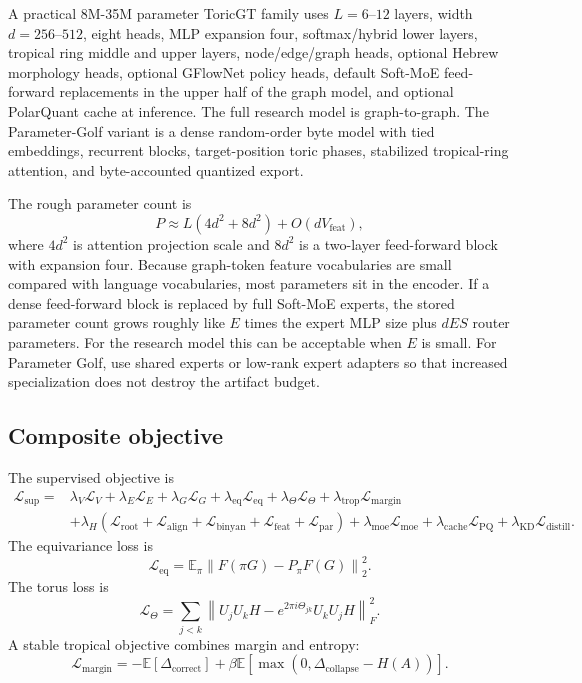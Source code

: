 \documentclass[11pt]{article}
\theoremstyle{definition}
\theoremstyle{plain}
\theoremstyle{remark}
\numberwithin{equation}{section}
\newcommand{\Eop}{\mathbb{E}}
\newcommand{\norm}[1]{\left\lVert #1\right\rVert}
\begin{document}
A practical 8M-35M parameter ToricGT family uses $L=6$--$12$ layers, width $d=256$--$512$, eight heads, MLP expansion four, softmax/hybrid lower layers, tropical ring middle and upper layers, node/edge/graph heads, optional Hebrew morphology heads, optional GFlowNet policy heads, default Soft-MoE feed-forward replacements in the upper half of the graph model, and optional PolarQuant cache at inference.  The full research model is graph-to-graph.  The Parameter-Golf variant is a dense random-order byte model with tied embeddings, recurrent blocks, target-position toric phases, stabilized tropical-ring attention, and byte-accounted quantized export.

The rough parameter count is
\begin{equation}
  P\approx L\left(4d^2+8d^2\right)+O(dV_{\mathrm{feat}}),
\end{equation}
where $4d^2$ is attention projection scale and $8d^2$ is a two-layer feed-forward block with expansion four.  Because graph-token feature vocabularies are small compared with language vocabularies, most parameters sit in the encoder.  If a dense feed-forward block is replaced by full Soft-MoE experts, the stored parameter count grows roughly like $E$ times the expert MLP size plus $dES$ router parameters.  For the research model this can be acceptable when $E$ is small.  For Parameter Golf, use shared experts or low-rank expert adapters so that increased specialization does not destroy the artifact budget.

\subsection{Composite objective}

The supervised objective is
\begin{equation}
\begin{split}
  \mathcal L_{\mathrm{sup}}={}&\lambda_V\mathcal L_V+\lambda_E\mathcal L_E+\lambda_G\mathcal L_G+
  \lambda_{\mathrm{eq}}\mathcal L_{\mathrm{eq}}+
  \lambda_\Theta\mathcal L_\Theta+\lambda_{\mathrm{trop}}\mathcal L_{\mathrm{margin}}\\
  &+\lambda_H(\mathcal L_{\mathrm{root}}+\mathcal L_{\mathrm{align}}+\mathcal L_{\mathrm{binyan}}+\mathcal L_{\mathrm{feat}}+\mathcal L_{\mathrm{par}})
  +\lambda_{\mathrm{moe}}\mathcal L_{\mathrm{moe}}
  +\lambda_{\mathrm{cache}}\mathcal L_{\mathrm{PQ}}
  +\lambda_{\mathrm{KD}}\mathcal L_{\mathrm{distill}}.
\end{split}
\end{equation}
The equivariance loss is
\begin{equation}
  \mathcal L_{\mathrm{eq}}=\Eop_{\pi}\norm{F(\pi G)-P_\pi F(G)}_2^2.
\end{equation}
The torus loss is
\begin{equation}
  \mathcal L_\Theta=\sum_{j<k}\norm{U_jU_kH-e^{2\pi i\Theta_{jk}}U_kU_jH}_F^2.
\end{equation}
A stable tropical objective combines margin and entropy:
\begin{equation}
  \mathcal L_{\mathrm{margin}}=-\Eop[\Delta_{\mathrm{correct}}]+\beta\Eop[\max(0,\Delta_{\mathrm{collapse}}-H(A))].
\end{equation}
\end{document}
